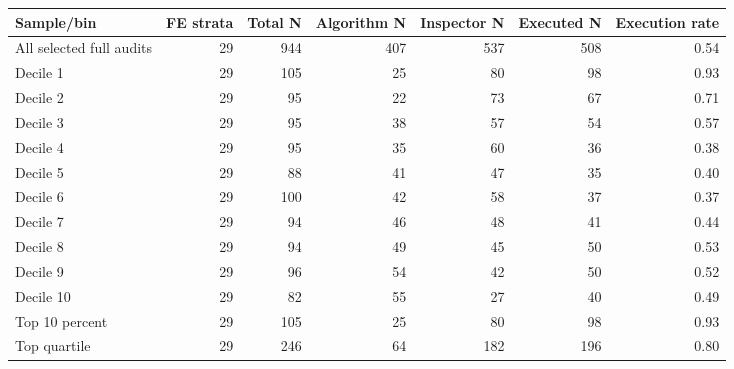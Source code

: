 \begin{tabular}{lrrrrrr}
\toprule
Sample/bin & FE strata & Total N & Algorithm N & Inspector N & Executed N & Execution rate \\
\midrule
All selected full audits & 29 & 944 & 407 & 537 & 508 &  0.54 \\
Decile 1 & 29 & 105 & 25 & 80 & 98 &  0.93 \\
Decile 2 & 29 & 95 & 22 & 73 & 67 &  0.71 \\
Decile 3 & 29 & 95 & 38 & 57 & 54 &  0.57 \\
Decile 4 & 29 & 95 & 35 & 60 & 36 &  0.38 \\
Decile 5 & 29 & 88 & 41 & 47 & 35 &  0.40 \\
Decile 6 & 29 & 100 & 42 & 58 & 37 &  0.37 \\
Decile 7 & 29 & 94 & 46 & 48 & 41 &  0.44 \\
Decile 8 & 29 & 94 & 49 & 45 & 50 &  0.53 \\
Decile 9 & 29 & 96 & 54 & 42 & 50 &  0.52 \\
Decile 10 & 29 & 82 & 55 & 27 & 40 &  0.49 \\
Top 10 percent & 29 & 105 & 25 & 80 & 98 &  0.93 \\
Top quartile & 29 & 246 & 64 & 182 & 196 &  0.80 \\
\bottomrule
\end{tabular}
